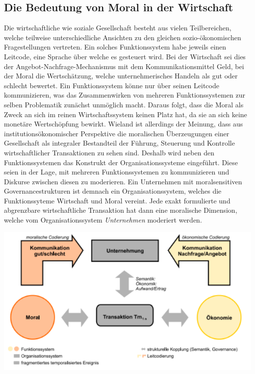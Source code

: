 \documentclass[12pt]{article}
\begin{document}
\subsection{Die Bedeutung von Moral in der Wirtschaft}
Die wirtschaftliche wie soziale Gesellschaft besteht aus vielen Teilbereichen, welche teilweise unterschiedliche Ansichten zu den gleichen sozio-ökonomischen Fragestellungen vertreten. Ein solches Funktionssystem habe jeweils einen Leitcode, eine Sprache über welche es gesteuert wird. Bei der Wirtschaft sei dies der Angebot-Nachfrage-Mechanismus mit dem Kommunikationsmittel Geld, bei der Moral die Wertschätzung, welche unternehmerisches Handeln als gut oder schlecht bewertet. Ein Funktionssystem könne nur über seinen Leitcode kommunizieren, was das Zusammenwirken von mehreren Funktionssystemen zur selben Problematik zunächst unmöglich macht. Daraus folgt, dass die Moral als Zweck an sich im reinen Wirtschaftssystem keinen Platz hat, da sie an sich keine monetäre Wertschöpfung bewirkt. Wieland ist allerdings der Meinung, dass aus institutionsökonomischer Perspektive die moralischen Überzeugungen einer Gesellschaft als integraler Bestandteil der Führung, Steuerung und Kontrolle wirtschaftlicher Transaktionen zu sehen sind. Deshalb wird neben den Funktionssystemen das Konstrukt der Organisationssysteme eingeführt. Diese seien in der Lage, mit mehreren Funktionssystemen zu kommunizieren und Diskurse zwischen diesen zu moderieren. Ein Unternehmen mit moralsensitiven Governancestrukturen ist demnach ein Organisationssystem, welches die Funktionssyteme Wirtschaft und Moral vereint. Jede exakt formulierte und abgrenzbare wirtschaftliche Transaktion hat dann eine moralische Dimension, welche vom Organisationssystem \textit{Unternehmen} moderiert werden.
\begin{center}
\includegraphics[width=.85\textwidth]{wieland1.png}
\end{center}
\end{document}
